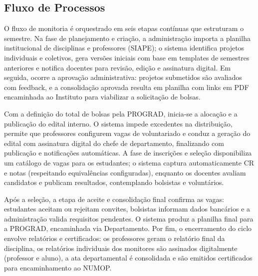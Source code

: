 \documentclass[portuguese]{sbc2025}%
\begin{document}
\subsection{Fluxo de Processos}

O fluxo de monitoria é orquestrado em seis etapas contínuas que estruturam o semestre. Na fase de planejamento e criação, a administração importa a planilha institucional de disciplinas e professores (SIAPE); o sistema identifica projetos individuais e coletivos, gera versões iniciais com base em templates de semestres anteriores e notifica docentes para revisão, edição e assinatura digital. Em seguida, ocorre a aprovação administrativa: projetos submetidos são avaliados com feedback, e a consolidação aprovada resulta em planilha com links em PDF encaminhada ao Instituto para viabilizar a solicitação de bolsas.

Com a definição do total de bolsas pela PROGRAD, inicia-se a alocação e a publicação do edital interno. O sistema impede excedentes na distribuição, permite que professores configurem vagas de voluntariado e conduz a geração do edital com assinatura digital do chefe de departamento, finalizando com publicação e notificações automáticas. A fase de inscrições e seleção disponibiliza um catálogo de vagas para os estudantes; o sistema captura automaticamente CR e notas (respeitando equivalências configuradas), enquanto os docentes avaliam candidatos e publicam resultados, contemplando bolsistas e voluntários.

Após a seleção, a etapa de aceite e consolidação final confirma as vagas: estudantes aceitam ou rejeitam convites, bolsistas informam dados bancários e a administração valida requisitos pendentes. O sistema produz a planilha final para a PROGRAD, encaminhada via Departamento. Por fim, o encerramento do ciclo envolve relatórios e certificados: os professores geram o relatório final da disciplina, os relatórios individuais dos monitores são assinados digitalmente (professor e aluno), a ata departamental é consolidada e são emitidos certificados para encaminhamento ao NUMOP.
\end{document}
